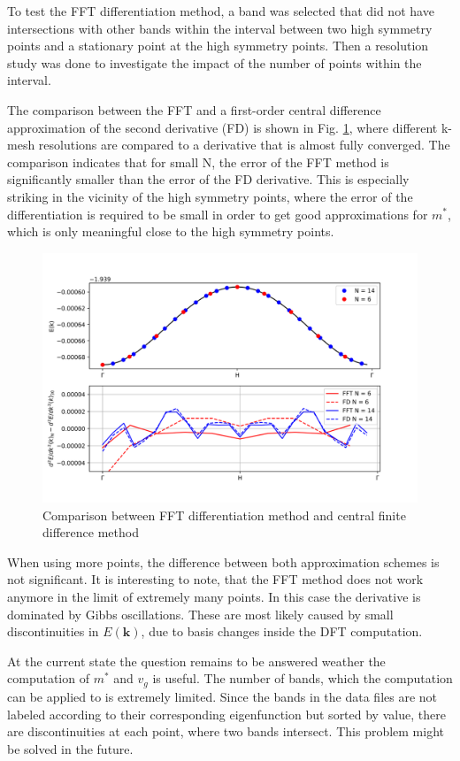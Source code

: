 To test the FFT differentiation method, a band was selected that did not have intersections with other bands within the interval between two high symmetry points and a stationary point at the high symmetry points. Then a resolution study was done to investigate the impact of the number of points within the interval.

The comparison between the FFT and a first-order central difference approximation of the second derivative (FD) is shown in Fig. \ref{num_diff}, where different k-mesh resolutions are compared to a derivative that is almost fully converged. The comparison indicates that for small N, the error of the FFT method is significantly smaller than the error of the FD derivative. This is especially striking in the vicinity of the high symmetry points, where the error of the differentiation is required to be small in order to get good approximations for $m^{*}$, which is only meaningful close to the high symmetry points.


\begin{figure}[htb!]
    \centering
    \includegraphics[width=0.7\linewidth]{christian/diff_compare.png}
    \caption{Comparison between FFT differentiation method and central finite difference method}
    \label{num_diff}
\end{figure}

When using more points, the difference between both approximation schemes is not significant. It is interesting to note, that the FFT method does not work anymore in the limit of extremely many points. In this case the derivative is dominated by Gibbs oscillations. These are most likely caused by small discontinuities in $E(\mathbf{k})$, due to basis changes inside the DFT computation.

At the current state the question remains to be answered weather the computation of $m^{*}$ and $v_g$ is useful. The number of bands, which the computation can be applied to is extremely limited. Since the bands in the data files are not labeled according to their corresponding eigenfunction but sorted by value, there are discontinuities at each point, where two bands intersect. This problem might be solved in the future. 













